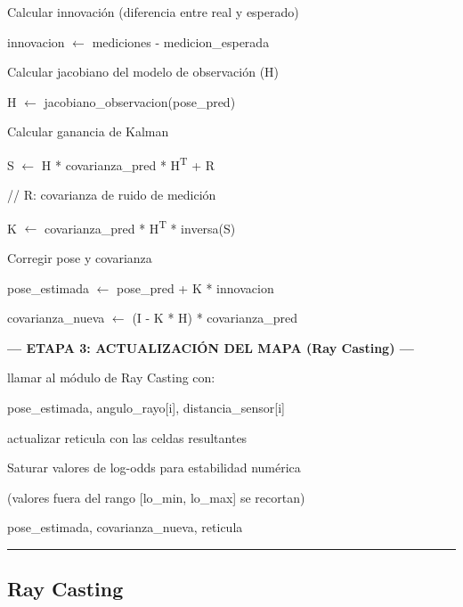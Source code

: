 \begin{algorithmic}[1]
\Statex
\State Calcular innovación (diferencia entre real y esperado)

\State innovacion $\gets$
mediciones - medicion\_esperada

\Statex
\State Calcular jacobiano del modelo de observación (H)

\State H $\gets$
jacobiano\_observacion(pose\_pred)

\Statex
\State Calcular ganancia de Kalman

\State S $\gets$
H * covarianza\_pred * H\textsuperscript{T} + R

\Statex \hspace{0.5cm}
// R: covarianza de ruido de medición

\State K $\gets$
covarianza\_pred * H\textsuperscript{T} * inversa(S)

\Statex
\State Corregir pose y covarianza

\State pose\_estimada $\gets$
pose\_pred + K * innovacion

\State covarianza\_nueva $\gets$
(I - K * H) * covarianza\_pred

\Statex
\Statex \textbf{--- ETAPA 3: ACTUALIZACIÓN DEL MAPA (Ray Casting) ---}

\Statex
{}

    \State llamar al módulo de Ray Casting con:

    \Statex \hspace{1.3cm}
    pose\_estimada, angulo\_rayo[i], distancia\_sensor[i]

    \State actualizar reticula con las celdas resultantes

\EndFor

\Statex
\State Saturar valores de log-odds para estabilidad numérica

\State (valores fuera del rango [lo\_min, lo\_max] se recortan)

\Statex
\State \Return pose\_estimada, covarianza\_nueva, reticula

\end{algorithmic}
\vspace{-0.9cm}
\rule{\textwidth}{0.4pt}

\subsection{Ray Casting}

